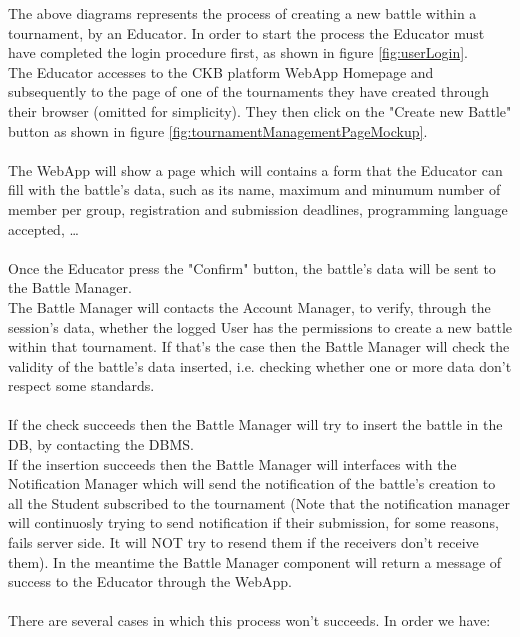 \documentclass{article}
\begin{document}
{        The above diagrams represents the process of creating a new battle within a tournament,
        by an Educator. In order to start the process the Educator must have completed the login 
        procedure first, as shown in figure \ref{fig:userLogin}. \\
        The Educator accesses to the CKB platform WebApp Homepage and subsequently
        to the page of one of the tournaments they have created through their browser
        (omitted for simplicity).
        They then click on the "Create new Battle" button as shown in figure \ref{fig:tournamentManagementPageMockup}.
        \\ \\
        The WebApp will show a page which will contains a form that the Educator can fill with
        the battle's data, such as its name, maximum and minumum number of member per group,
        registration and submission deadlines, programming language accepted, \dots 
        \\ \\
        Once the Educator press the "Confirm" button,
        the battle's data will be sent to the Battle Manager. \\
        The Battle Manager will contacts the Account Manager, to verify, through the session's 
        data, whether the logged User has the permissions to create a new battle within that 
        tournament. 
        If that's the case then the Battle Manager will check the validity of the battle's data 
        inserted, i.e. checking whether one or more data don't respect some standards.
        \\ \\
        If the check succeeds then the Battle Manager will try to insert the battle in the DB,
        by contacting the DBMS. \\
        If the insertion succeeds then the Battle Manager will interfaces with the Notification
        Manager which will send the notification of the battle's creation to all the Student
        subscribed to the tournament (Note that the notification manager will continuosly trying 
        to send notification if their submission, for some reasons, fails server side. It will 
        NOT try to resend them if the receivers don't receive them). 
        In the meantime the Battle Manager component will return a message of success to 
        the Educator through the WebApp.
        \\ \\
        There are several cases in which this process won't succeeds. In order we have:
}
\end{document}
